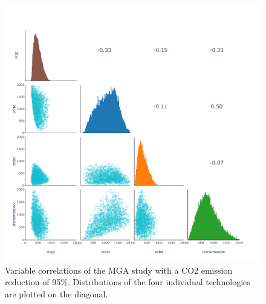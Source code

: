 \begin{figure}[p]\centerfloat
	\includegraphics[width=1.2\textwidth,trim={0 0cm 0 0cm},clip]{./Images/corelation_4D}
	\caption{Variable correlations of the MGA study with a CO2 emission reduction of 95\%. Distributions of the four individual technologies are plotted on the diagonal.}
\end{figure}




